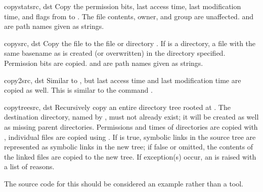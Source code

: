 \begin{funcdesc}{copystat}{src, dst}
  Copy the permission bits, last access time, last modification time,
  and flags from  to .  The file contents, owner, and
  group are unaffected.   and  are path names given
  as strings.
\end{funcdesc}

\begin{funcdesc}{copy}{src, dst}
  Copy the file  to the file or directory .  If
   is a directory, a file with the same basename as  
  is created (or overwritten) in the directory specified.  Permission
  bits are copied.   and  are path names given as
  strings.
\end{funcdesc}

\begin{funcdesc}{copy2}{src, dst}
  Similar to , but last access time and last
  modification time are copied as well.  This is similar to the
  \UNIX{} command  .
\end{funcdesc}

\begin{funcdesc}{copytree}{src, dst}
  Recursively copy an entire directory tree rooted at .  The
  destination directory, named by , must not already exist;
  it will be created as well as missing parent directories.
  Permissions and times of directories are copied with ,
  individual files are copied using .  
  If  is true, symbolic links in
  the source tree are represented as symbolic links in the new tree;
  if false or omitted, the contents of the linked files are copied to
  the new tree.  If exception(s) occur, an  is raised
  with a list of reasons.

  The source code for this should be considered an example rather than 
  a tool.



\end{funcdesc}

